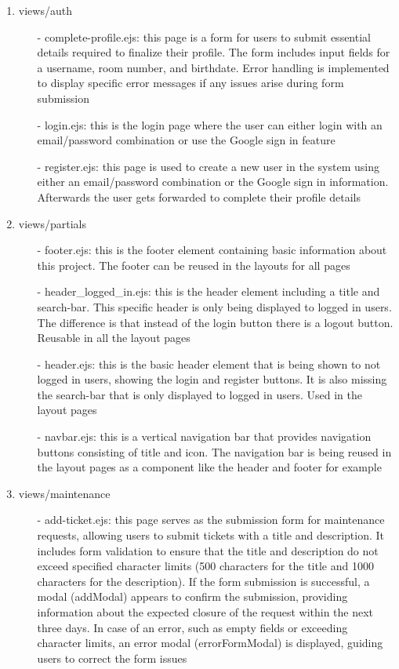 \documentclass[conference]{IEEEtran}
\begin{document}
\begin{enumerate}
\begin{enumerate}
            \item views/auth
                \begin{itemize}
                    \item[-] complete-profile.ejs: this page is a form for users to submit essential details required to finalize their profile. The form includes input fields for a username, room number, and birthdate. Error handling is implemented to display specific error messages if any issues arise during form submission
                    \item[-] login.ejs: this is the login page where the user can either login with an email/password combination or use the Google sign in feature
                    \item[-] register.ejs: this page is used to create a new user in the system using either an email/password combination or the Google sign in information. Afterwards the user gets forwarded to complete their profile details
                \end{itemize}
            \item views/partials
                \begin{itemize}
                    \item[-] footer.ejs: this is the footer element containing basic information about this project. The footer can be reused in the layouts for all pages
                    \item[-] header\_logged\_in.ejs: this is the header element including a title and search-bar. This specific header is only being displayed to logged in users. The difference is that instead of the login button there is a logout button. Reusable in all the layout pages
                    \item[-] header.ejs: this is the basic header element that is being shown to not logged in users, showing the login and register buttons. It is also missing the search-bar that is only displayed to logged in users. Used in the layout pages
                    \item[-] navbar.ejs: this is a vertical navigation bar that provides navigation buttons consisting of title and icon. The navigation bar is being reused in the layout pages as a component like the header and footer for example
                \end{itemize}
            \item views/maintenance
                \begin{itemize}
                    \item[-] add-ticket.ejs: this page serves as the submission form for maintenance requests, allowing users to submit tickets with a title and description. It includes form validation to ensure that the title and description do not exceed specified character limits (500 characters for the title and 1000 characters for the description). If the form submission is successful, a modal (addModal) appears to confirm the submission, providing information about the expected closure of the request within the next three days. In case of an error, such as empty fields or exceeding character limits, an error modal (errorFormModal) is displayed, guiding users to correct the form issues

\end{itemize}
\end{enumerate}
\end{enumerate}
\end{document}
